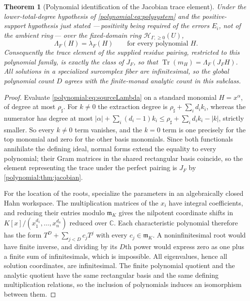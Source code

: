 \documentclass[11pt,letterpaper]{article}
\numberwithin{equation}{section}
\newtheorem{theorem}{Theorem}[section]
\theoremstyle{definition}
\theoremstyle{remark}\newtheorem{remark}[theorem]{Remark}
\newcommand{\C}{\mathbb C}
\newcommand{\mm}{\mathfrak m}
\newcommand{\HHn}{\mathscr H_{\Gamma,\ge0}}
\newcommand{\Tr}{\operatorname{Tr}}
\begin{document}
\begin{theorem}[Polynomial identification of the Jacobian trace element]
\label{polynomial:thm:analyticcomparison}
Under the lower-total-degree hypothesis of
\eqref{polynomial:eq:polysystem} \emph{and} the positive-support hypothesis
just stated ---\,positivity being required of the errors $E_i$, not of the
ambient ring\,--- over the fixed-domain ring $\HHn(U)$,
\begin{equation}\label{polynomial:eq:residuecomparison}
 \Lambda_F(H)=\lambda_F(H)\qquad\text{for every polynomial }H .
\end{equation}
Consequently the trace element of the supplied residue pairing, restricted to
this polynomial family, is exactly the class of $J_F$, so that
$\Tr(m_H)=\Lambda_F(J_FH)$. All solutions in a specialized surcomplex fiber
are infinitesimal, so the global polynomial count $D$ agrees with the
finite-monad analytic count in this subclass.
\end{theorem}
\begin{proof}
Evaluate \eqref{polynomial:eq:sourceLambda} on a standard monomial
$H=x^\alpha$, of degree at most $\rho_\sharp$. For $k\ne0$ the extraction
degree is $\rho_\sharp+\sum_id_ik_i$, whereas the numerator has degree at most
$|\alpha|+\sum_i(d_i-1)k_i\le\rho_\sharp+\sum_id_ik_i-|k|$, strictly smaller.
So every $k\ne0$ term vanishes, and the $k=0$ term is one precisely for the
top monomial and zero for the other basis monomials. Since both functionals
annihilate the defining ideal, normal forms extend the equality to every
polynomial; their Gram matrices in the shared rectangular basis coincide, so
the element representing the trace under the perfect pairing is $J_F$ by
\cref{polynomial:thm:jacobian}.

For the location of the roots, specialize the parameters in an algebraically
closed Hahn workspace. The multiplication matrices of the $x_i$ have integral
coefficients, and reducing their entries modulo $\mm_K$ gives the nilpotent
coordinate shifts in $K[x]/(x_1^{d_1},\ldots,x_n^{d_n})$ reduced over $\C$.
Each characteristic polynomial therefore has the form $T^D+\sum_{j<D}c_jT^j$
with every $c_j\in\mm_K$. A noninfinitesimal root would have finite inverse,
and dividing by its $D$th power would express zero as one plus a finite sum of
infinitesimals, which is impossible. All eigenvalues, hence all solution
coordinates, are infinitesimal. The finite polynomial quotient and the
analytic quotient have the same rectangular basis and the same defining
multiplication relations, so the inclusion of polynomials induces an
isomorphism between them.
\end{proof}
\end{document}
